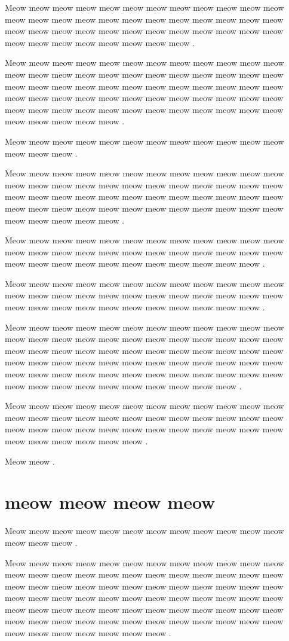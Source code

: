 \documentclass[12pt, a5paper, openany]{book}
\begin{document}
Meow meow meow meow meow meow meow meow meow meow meow meow meow meow meow meow meow meow meow meow meow meow meow meow meow meow meow meow meow meow meow meow meow meow meow meow meow meow meow meow meow meow meow meow .

Meow meow meow meow meow meow meow meow meow meow meow meow meow meow meow meow meow meow meow meow meow meow meow meow meow meow meow meow meow meow meow meow meow meow meow meow meow meow meow meow meow meow meow meow meow meow meow meow meow meow meow meow meow meow meow meow meow meow meow meow meow meow meow meow meow .

Meow meow meow meow meow meow meow meow meow meow meow meow meow meow meow .

Meow meow meow meow meow meow meow meow meow meow meow meow meow meow meow meow meow meow meow meow meow meow meow meow meow meow meow meow meow meow meow meow meow meow meow meow meow meow meow meow meow meow meow meow meow meow meow meow meow meow meow meow meow .

Meow meow meow meow meow meow meow meow meow meow meow meow meow meow meow meow meow meow meow meow meow meow meow meow meow meow meow meow meow meow meow meow meow meow meow .

Meow meow meow meow meow meow meow meow meow meow meow meow meow meow meow meow meow meow meow meow meow meow meow meow meow meow meow meow meow meow meow meow meow meow meow .

Meow meow meow meow meow meow meow meow meow meow meow meow meow meow meow meow meow meow meow meow meow meow meow meow meow meow meow meow meow meow meow meow meow meow meow meow meow meow meow meow meow meow meow meow meow meow meow meow meow meow meow meow meow meow meow meow meow meow meow meow meow meow meow meow meow meow meow meow meow meow .

Meow meow meow meow meow meow meow meow meow meow meow meow meow meow meow meow meow meow meow meow meow meow meow meow meow meow meow meow meow meow meow meow meow meow meow meow meow meow meow meow meow meow .

Meow meow .



\chapter{meow meow meow meow }Meow meow meow meow meow meow meow meow meow meow meow meow meow meow meow .

Meow meow meow meow meow meow meow meow meow meow meow meow meow meow meow meow meow meow meow meow meow meow meow meow meow meow meow meow meow meow meow meow meow meow meow meow meow meow meow meow meow meow meow meow meow meow meow meow meow meow meow meow meow meow meow meow meow meow meow meow meow meow meow meow meow meow meow meow meow meow meow meow meow meow meow meow meow meow meow .
\end{document}
